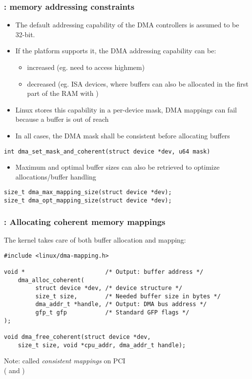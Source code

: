 \begin{frame}[fragile]
  \frametitle{: memory addressing constraints}
  \begin{itemize}
  \item The default addressing capability of the DMA controllers is
    assumed to be 32-bit.
  \item If the platform supports it, the DMA addressing capability can be:
    \begin{itemize}
    \item increased (eg. need to access highmem)
    \item decreased (eg. ISA devices, where  buffers can
      also be allocated in the first part of the RAM with
      )
    \end{itemize}
  \item Linux stores this capability in a per-device mask, DMA mappings
    can fail because a buffer is out of reach
  \item In all cases, the DMA mask shall be consistent before
    allocating buffers
  \end{itemize}
\begin{verbatim}
int dma_set_mask_and_coherent(struct device *dev, u64 mask)
\end{verbatim}
  \begin{itemize}
  \item Maximum and optimal buffer sizes can also be retrieved to
    optimize allocations/buffer handling
  \end{itemize}
\begin{verbatim}
size_t dma_max_mapping_size(struct device *dev);
size_t dma_opt_mapping_size(struct device *dev);
\end{verbatim}
\end{frame}

\begin{frame}[fragile]
  \frametitle{: Allocating coherent memory mappings}
  The kernel takes care of both buffer allocation and mapping:
  \vfill
\begin{verbatim}
#include <linux/dma-mapping.h>

void *                       /* Output: buffer address */
    dma_alloc_coherent(
         struct device *dev, /* device structure */
         size_t size,        /* Needed buffer size in bytes */
         dma_addr_t *handle, /* Output: DMA bus address */
         gfp_t gfp           /* Standard GFP flags */
);

void dma_free_coherent(struct device *dev,
    size_t size, void *cpu_addr, dma_addr_t handle);
  \end{verbatim}
  \vfill
Note: called {\em consistent mappings} on PCI\\
( and )
\end{frame}

